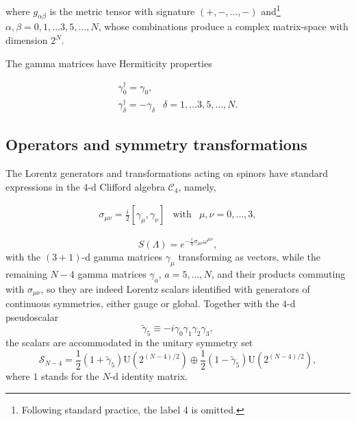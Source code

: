 \documentclass[12pt]{article}
\renewcommand\[{\begin{dmath}}
\renewcommand\]{\end{dmath}}
\begin{document}
\noindent where $g_{\alpha\beta}$ is the metric tensor with signature $(+,-,...,-)$
and\footnote{Following standard practice, the label 4 is omitted.} $\alpha,\beta=0,1,\ldots3,5,\ldots,N$,
 whose combinations produce a complex matrix-space  with  dimension $2^{N}$.

The gamma matrices have      Hermiticity  properties

\begin{equation}
\begin{array}{rc}
\gamma_{0}^{\dagger}=\gamma_{0},\\
\gamma_{  \delta}^{\dagger}=-\gamma_{ \delta} &   \delta= 1,\ldots3,5,\ldots,N.
\end{array}\label{eq:1-1}
\end{equation}

\subsection{Operators and symmetry transformations }

\noindent
The   Lorentz generators and  transformations acting
on spinors have standard expressions in the 4-d Clifford
algebra $\mathcal{C}_{4}$, namely,

\begin{equation}
\label{sigmamunugen}
\begin{array}{ccc}
\sigma_{\mu\nu}=\frac{i}{2}\left[\gamma_{\mu},\gamma_{\nu}\right] & \textrm{with} & \mu,\nu=0,\ldots,3,\end{array}
\end{equation}

\noindent
\begin{equation}
S(\Lambda)=e^{-\frac{i}{4}\sigma_{\mu\nu}\omega^{\mu\nu}},\label{eq:3}
\end{equation}
with the $(3+1)$-d  gamma matrices $\gamma_{\mu}$ transforming
as vectors,
  while the remaining $N-4$ gamma
matrices $\gamma_{a}$, $a=5,\ldots,N$, and their products commuting
with $\sigma_{\mu\nu}$,
so they  are indeed Lorentz scalars
  identified with generators of continuous
symmetries, either gauge or global.
Together with the $4$-d pseudoscalar \noindent
\begin{equation}
\tilde{\gamma}_{5}\equiv-i\gamma_{0}\gamma_{1}\gamma_{2}\gamma_{3},\label{eq:4-1}
\end{equation}
 the scalars are accommodated in the unitary symmetry set
\begin{equation}
\label{SNm4}
\mathcal{S}_{N-4}=\frac{1}{2}(1+\tilde{\gamma}_{5})\textrm{U}\left(2^{(N-4)/2}\right)\oplus\frac{1}{2}(1-\tilde{\gamma}_{5})\textrm{U}\left(2^{(N-4)/2}\right),
\end{equation}
 where $1$ stands for the $N$-d identity matrix.
\end{document}

